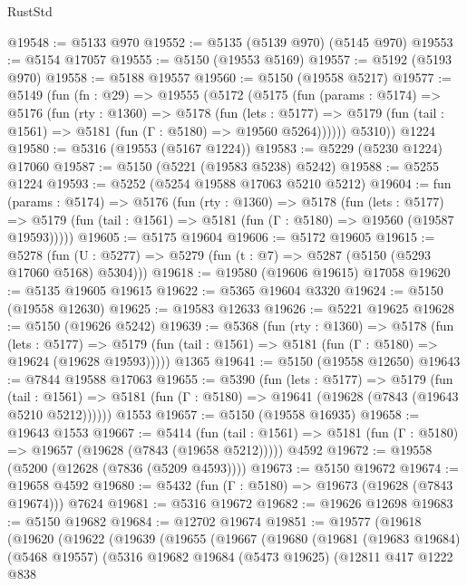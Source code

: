 \begin{lexlean}{RustStd}
\begin{coremodule}
@19548 := @5133 @970
@19552 := @5135 (@5139 @970) (@5145 @970)
@19553 := @5154 @17057
@19555 := @5150 (@19553 @5169)
@19557 := @5192 (@5193 @970)
@19558 := @5188 @19557
@19560 := @5150 (@19558 @5217)
@19577 := @5149
    (fun (fn : @29) =>
    @19555
      (@5172
        (@5175
          (fun (params : @5174) =>
          @5176
            (fun (rty : @1360) =>
            @5178
              (fun (lets : @5177) =>
              @5179 (fun (tail : @1561) => @5181 (fun (Γ : @5180) => @19560 @5264))))))
        @5310))
    @1224
@19580 := @5316 (@19553 (@5167 @1224))
@19583 := @5229 (@5230 @1224) @17060
@19587 := @5150 (@5221 (@19583 @5238) @5242)
@19588 := @5255 @1224
@19593 := @5252 (@5254 @19588 @17063 @5210 @5212)
@19604 := fun (params : @5174) =>
  @5176
    (fun (rty : @1360) =>
    @5178
      (fun (lets : @5177) =>
      @5179 (fun (tail : @1561) => @5181 (fun (Γ : @5180) => @19560 (@19587 @19593)))))
@19605 := @5175 @19604
@19606 := @5172 @19605
@19615 := @5278
    (fun (U : @5277) => @5279 (fun (t : @7) => @5287 (@5150 (@5293 @17060 @5168) @5304)))
@19618 := @19580 (@19606 @19615) @17058
@19620 := @5135 @19605 @19615
@19622 := @5365 @19604 @3320
@19624 := @5150 (@19558 @12630)
@19625 := @19583 @12633
@19626 := @5221 @19625
@19628 := @5150 (@19626 @5242)
@19639 := @5368
    (fun (rty : @1360) =>
    @5178
      (fun (lets : @5177) =>
      @5179 (fun (tail : @1561) => @5181 (fun (Γ : @5180) => @19624 (@19628 @19593)))))
    @1365
@19641 := @5150 (@19558 @12650)
@19643 := @7844 @19588 @17063
@19655 := @5390
    (fun (lets : @5177) =>
    @5179
      (fun (tail : @1561) =>
      @5181 (fun (Γ : @5180) => @19641 (@19628 (@7843 (@19643 @5210 @5212))))))
    @1553
@19657 := @5150 (@19558 @16935)
@19658 := @19643 @1553
@19667 := @5414
    (fun (tail : @1561) => @5181 (fun (Γ : @5180) => @19657 (@19628 (@7843 (@19658 @5212)))))
    @4592
@19672 := @19558 (@5200 (@12628 (@7836 (@5209 @4593))))
@19673 := @5150 @19672
@19674 := @19658 @4592
@19680 := @5432 (fun (Γ : @5180) => @19673 (@19628 (@7843 @19674))) @7624
@19681 := @5316 @19672
@19682 := @19626 @12698
@19683 := @5150 @19682
@19684 := @12702 @19674
@19851 := @19577
    (@19618
      (@19620
        (@19622
          (@19639
            (@19655
              (@19667
                (@19680
                  (@19681
                    (@19683 @19684)
                    (@5468 @19557)
                    (@5316
                      @19682
                      @19684
                      (@5473 @19625)
                      (@12811
                        @417
                        @1222
                        @838

\end{coremodule}
\end{lexlean}
